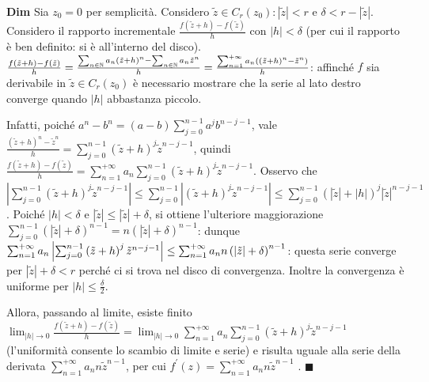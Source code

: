 \documentclass{article}
\begin{document}
\textbf{Dim} Sia $z_{0}=0$ per
semplicit\`{a}. Considero $\tilde{z}\in C_{r}\left( z_{0}\right) :\left\vert 
\tilde{z}\right\vert <r$ e $\delta <r-\left\vert \tilde{z}\right\vert $.
Considero il rapporto incrementale $\frac{f\left( \tilde{z}+h\right)
-f\left( \tilde{z}\right) }{h}$ con $\left\vert h\right\vert <\delta $ (per
cui il rapporto \`{e} ben definito: si \`{e} all'interno del disco). $\frac{%
f\left( \tilde{z}+h\right) -f\left( \tilde{z}\right) }{h}=\frac{\sum_{n\in 
\mathbb{N}
}a_{n}\left( \tilde{z}+h\right) ^{n}-\sum_{n\in 
\mathbb{N}
}a_{n}\tilde{z}^{n}}{h}=\frac{\sum_{n=1}^{+\infty }a_{n}\left( \left( \tilde{%
z}+h\right) ^{n}-\tilde{z}^{n}\right) }{h}$: affinch\'{e} $f$ sia derivabile
in $\tilde{z}\in C_{r}\left( z_{0}\right) $ \`{e} necessario mostrare che la
serie al lato destro converge quando $\left\vert h\right\vert $ abbastanza
piccolo.

Infatti, poich\'{e} $a^{n}-b^{n}=\left( a-b\right)
\sum_{j=0}^{n-1}a^{j}b^{n-j-1}$, vale $\frac{\left( \tilde{z}+h\right) ^{n}-%
\tilde{z}^{n}}{h}=\sum_{j=0}^{n-1}\left( \tilde{z}+h\right) ^{j}\tilde{z}%
^{n-j-1}$, quindi $\frac{f\left( \tilde{z}+h\right) -f\left( \tilde{z}%
\right) }{h}=\sum_{n=1}^{+\infty }a_{n}\sum_{j=0}^{n-1}\left( \tilde{z}%
+h\right) ^{j}\tilde{z}^{n-j-1}$. Osservo che $\left\vert
\sum_{j=0}^{n-1}\left( \tilde{z}+h\right) ^{j}\tilde{z}^{n-j-1}\right\vert
\leq \sum_{j=0}^{n-1}\left\vert \left( \tilde{z}+h\right) ^{j}\tilde{z}%
^{n-j-1}\right\vert \leq \sum_{j=0}^{n-1}\left( \left\vert \tilde{z}%
\right\vert +\left\vert h\right\vert \right) ^{j}\left\vert \tilde{z}%
\right\vert ^{n-j-1}$. Poich\'{e} $\left\vert h\right\vert <\delta $ e $%
\left\vert \tilde{z}\right\vert \leq \left\vert \tilde{z}\right\vert +\delta 
$, si ottiene l'ulteriore maggiorazione $\sum_{j=0}^{n-1}\left( \left\vert 
\tilde{z}\right\vert +\delta \right) ^{n-1}=n\left( \left\vert \tilde{z}%
\right\vert +\delta \right) ^{n-1}$: dunque $\sum_{n=1}^{+\infty
}a_{n}\left\vert \sum_{j=0}^{n-1}\left( \tilde{z}+h\right) ^{j}\tilde{z}%
^{n-j-1}\right\vert \leq \sum_{n=1}^{+\infty }a_{n}n\left( \left\vert \tilde{%
z}\right\vert +\delta \right) ^{n-1}$: questa serie converge per $\left\vert 
\tilde{z}\right\vert +\delta <r$ perch\'{e} ci si trova nel disco di
convergenza. Inoltre la convergenza \`{e} uniforme per $\left\vert
h\right\vert \leq \frac{\delta }{2}$.

Allora, passando al limite, esiste finito $\lim_{\left\vert h\right\vert
\rightarrow 0}\frac{f\left( \tilde{z}+h\right) -f\left( \tilde{z}\right) }{h}%
=\lim_{\left\vert h\right\vert \rightarrow 0}\sum_{n=1}^{+\infty
}a_{n}\sum_{j=0}^{n-1}\left( \tilde{z}+h\right) ^{j}\tilde{z}^{n-j-1}$
(l'uniformit\`{a} consente lo scambio di limite e serie) e risulta uguale
alla serie della derivata $\sum_{n=1}^{+\infty }a_{n}n\tilde{z}^{n-1}$, per
cui $f^{\prime }\left( z\right) =\sum_{n=1}^{+\infty }a_{n}n\tilde{z}^{n-1}$%
. $\blacksquare $
\end{document}
